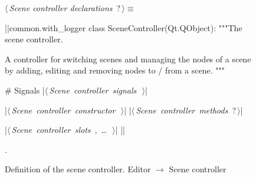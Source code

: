\documentclass[%
    a4paper,    %
    justified,  %
    nobib,      %
    openany     %
]{tufte-book}
\begin{document}
\begin{figure}
\begin{flushleft} \small
\begin{minipage}{\linewidth}\label{scrap87}\raggedright\small
{} $\langle\,${\itshape Scene controller declarations}\nobreak\ {\footnotesize {?}}$\,\rangle\equiv$
\vspace{-1ex}
\begin{pythoncode}
|\normalfont{}\fontfamily{}|common.with_logger
class SceneController(Qt.QObject):
    """The scene controller.

    A controller for switching scenes and managing the nodes of a scene by
    adding, editing and removing nodes to / from a scene.
    """

    # Signals
    |\hbox{$\langle\,${\itshape Scene controller signals}\nobreak\ {\footnotesize {}}$\,\rangle$}|

    |\hbox{$\langle\,${\itshape Scene controller constructor}\nobreak\ {\footnotesize {}}$\,\rangle$}|
    |\hbox{$\langle\,${\itshape Scene controller methods}\nobreak\ {\footnotesize ?}$\,\rangle$}|

    |\hbox{$\langle\,${\itshape Scene controller slots}\nobreak\ {\footnotesize {}, \ldots\ }$\,\rangle$}|
|\NWsep|
\end{pythoncode}
\vspace{1.5ex}
\footnotesize
\begin{list}{}{\setlength{\itemsep}{-\parsep}\setlength{\itemindent}{-\leftmargin}}
\item {\NWtxtMacroNoRef}.

\item{}
\end{list}
\end{minipage}\vspace{4ex}
\end{flushleft}
\caption{Definition of the scene controller.
  \newline{}\newline{}Editor $\rightarrow$ Scene controller}
\label{editor:lst:scene-controller}
\end{figure}
\end{document}

